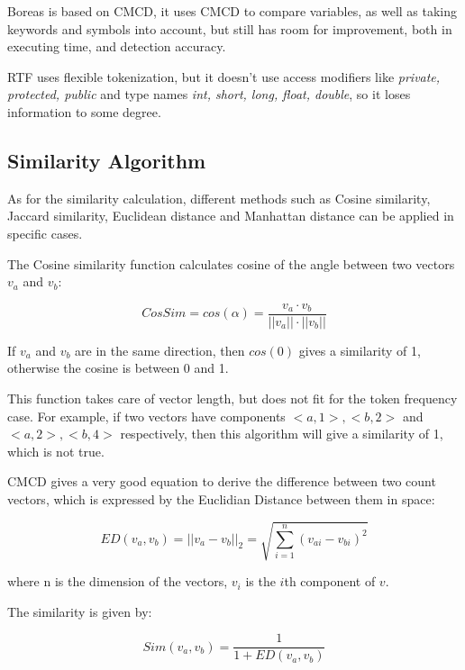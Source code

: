 \documentclass[../main.tex]{subfiles}
\begin{document}
Boreas is based on CMCD, it uses CMCD to compare variables, as well as taking keywords and symbols into account, but still has room for improvement, both in executing time, and detection accuracy. 

RTF uses flexible tokenization, but it doesn't use access modifiers like \emph{private, protected, public} and type names \emph{int, short, long, float, double}, so it loses information to some degree.

\subsection{Similarity Algorithm}

As for the similarity calculation, different methods such as Cosine similarity, Jaccard similarity, Euclidean distance and Manhattan distance can be applied in specific cases.

The Cosine similarity function calculates cosine of the angle between two vectors $v_a$ and $v_b$:

\begin{equation}
CosSim = cos(\alpha) = \frac{v_a \cdot v_b}{||v_a|| \cdot ||v_b||} \nonumber
\end{equation}

If $v_a$ and $v_b$ are in the same direction, then $cos(0)$ gives a similarity of 1, otherwise the cosine is between 0 and 1. 

This function takes care of vector length, but does not fit for the token frequency case. For example, if two vectors have components $<a, 1>, <b, 2>$ and $<a, 2>, <b, 4>$ respectively, then this algorithm will give a similarity of 1, which is not true.



CMCD gives a very good equation to derive the difference between two count vectors, which is expressed by the Euclidian Distance between them in space:

\begin{equation}
ED(v_a, v_b) = ||v_a - v_b||_2 = \sqrt{\sum_{i=1}^n(v_{ai} - v_{bi})^2} \nonumber
\end{equation}

where n is the dimension of the vectors, $v_i$ is the $i$th component of $v$.

The similarity is given by:

\begin{equation}
Sim(v_a, v_b) = \frac{1}{1 + ED(v_a, v_b)}
\end{equation}
\end{document}
